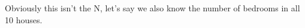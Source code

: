 \documentclass{article}
\begin{document}
Obviously this isn't the N, let's say we also know the number of bedrooms in all 10 houses. 







\end{document}
